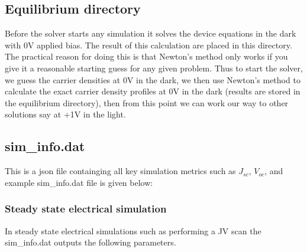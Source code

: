 \subsection{Equilibrium directory}
Before the solver starts any simulation it solves the device equations in the dark with 0V applied bias.  The result of this calculation are placed in this directory.  The practical reason for doing this is that Newton's method only works if you give it a reasonable starting guess for any given problem.  Thus to start the solver, we guess the carrier densities at 0V in the dark, we then use Newton's method to calculate the exact carrier density profiles at 0V in the dark (results are stored in the equilibrium directory), then from this point we can work our way to other solutions say at +1V in the light.\cite{0953-8984-25-21-215301}

\subsection{sim\_info.dat}
\label{sec:siminfo}
This is a json file containging all key simulation metrics such as $J_{sc}$, $V_{oc}$, and example sim\_info.dat file is given below:


\subsubsection{Steady state electrical simulation}
\label{sec:siminfo}
In steady state electrical simulations such as performing a JV scan the sim\_info.dat outputs the following parameters.


